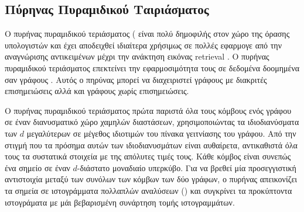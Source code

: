 \subsection{Πύρηνας Πυραμιδικού Ταιριάσματος}
Ο πυρήνας πυραμιδικού τεριάσματος ( είναι πολύ δημοφιλής στον χώρο της όρασης υπολογιστών και έχει αποδειχθεί ιδιαίτερα χρήσιμως σε πολλές εφαρμογε από την αναγνώρισης αντικειμένων μέχρι την ανάκτηση εικόνας retrieval \cite{grauman2007pyramid,lazebnik2006beyond}.
Ο πυρήνας πυραμιδικού τεριάσματος επεκτείνει την εφαρμοσιμότητα τους σε δεδομένα δοομημένα σαν γράφους \cite{nikolentzos2017matching}.
Αυτός ο πηρύνας μπορεί να διαχειριστεί γράφους με διακριτές επισημειώσεις αλλά και γράφους χωρίς επισημειώσεις.

Ο πυρήνας πυραμιδικού τεριάσματος πρώτα παριστά όλα τους κόμβους ενός γράφου σε έναν διανυσματικό χώρο χαμηλών διαστάσεων, χρησιμοποιώντας τα ιδιοδιανύσματα των $d$ μεγαλύτερων σε μέγεθος ιδιοτιμών του πίνακα γειτνίασης του γράφου.
Από την στιγμή που τα πρόσημα αυτών των ιδιοδιανυσμάτων είναι αυθαίρετα, αντικαθιστά όλα τους τα συστατικά στοιχεία με της απόλυτες τιμές τους.
Κάθε κόμβος είναι συνεπώς ένα σημείο σε έναν $d$-διάστατο μοναδιαίο υπερκύβο.
Για να βρεθεί μία προσεγγιστική αντιστοιχία μεταξύ των συνόλων των κόμβων των δύο γράφων, ο πυρήνας απεικονίζει τα σημεία σε ιστογράμματα πολλαπλών αναλύσεων () και συγκρίνει τα προκύπτοντα ιστογράματα με μάι βεβαρισμένη συνάρτηση τομής ιστογραμμάτων.

